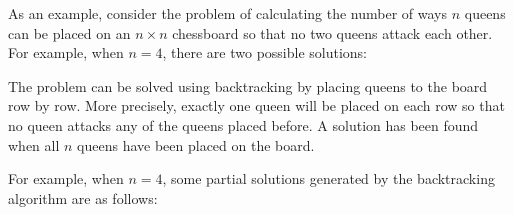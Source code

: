 
As an example, consider the problem of
calculating the number
of ways $n$ queens can be placed on
an $n \times n$ chessboard so that
no two queens attack each other.
For example, when $n=4$,
there are two possible solutions:

\begin{center}
\end{center}

The problem can be solved using backtracking
by placing queens to the board row by row.
More precisely, exactly one queen will
be placed on each row so that no queen attacks
any of the queens placed before.
A solution has been found when all
$n$ queens have been placed on the board.

For example, when $n=4$,
some partial solutions generated by
the backtracking algorithm are as follows:


